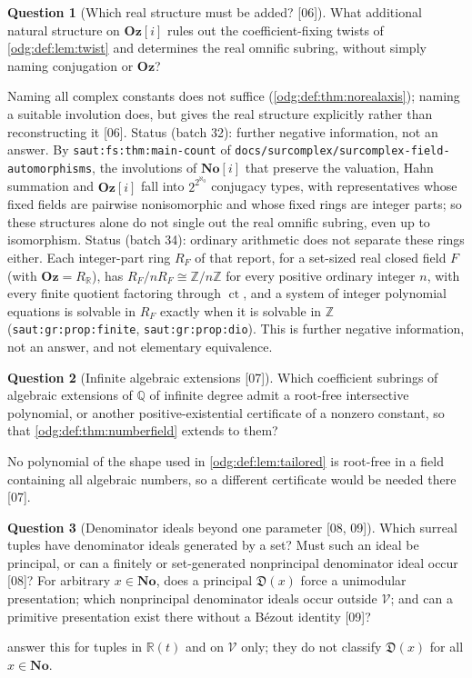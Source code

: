 \documentclass[11pt,oneside]{article}
\numberwithin{equation}{section}
\theoremstyle{definition}
\newtheorem{question}[question]{Question}
\theoremstyle{remark}
\newcommand{\No}{\mathbf{No}}
\newcommand{\Oz}{\mathbf{Oz}}
\newcommand{\Z}{\mathbb Z}
\newcommand{\Q}{\mathbb Q}
\newcommand{\R}{\mathbb R}
\newcommand{\ct}{\operatorname{ct}}
\newcommand{\src}[1]{\textup{\textsf{\small[#1]}}}
\newcommand{\replabel}[1]{\nolinkurl{#1}}
\newcommand{\fn}[1]{\nolinkurl{#1}}
\newcommand{\Og}{\Oz[i]}
\newcommand{\Den}{\mathfrak D}
\newcommand{\Vreg}{\mathcal V}
\begin{document}
\begin{question}[Which real structure must be added? \src{06}]\label{odg:def:q:realform}
What additional natural structure on $\Og$ rules out the coefficient-fixing
twists of \cref{odg:def:lem:twist} and determines the real omnific subring,
without simply naming conjugation or $\Oz$?
\end{question}
Naming all complex constants does not suffice
(\cref{odg:def:thm:norealaxis}); naming a suitable involution does, but
gives the real structure explicitly rather than reconstructing it \src{06}.
Status (batch 32): further negative information, not an answer. By
\replabel{saut:fs:thm:main-count} of
\fn{docs/surcomplex/surcomplex-field-automorphisms}, the involutions of $\No[i]$
that preserve the valuation, Hahn summation and $\Og$ fall into
$2^{2^{\aleph_0}}$ conjugacy types, with representatives whose fixed fields are
pairwise nonisomorphic and whose fixed rings are integer parts; so these
structures alone do not single out the real omnific subring, even up to
isomorphism.
Status (batch 34): ordinary arithmetic does not separate these rings either.
Each integer-part ring $R_F$ of that report, for a set-sized real closed
field $F$ (with $\Oz=R_{\R}$), has $R_F/nR_F\cong\Z/n\Z$ for every positive ordinary
integer $n$, with every finite
quotient factoring through $\ct$, and a system of integer polynomial
equations is solvable in $R_F$ exactly when it is solvable in $\Z$
(\replabel{saut:gr:prop:finite}, \replabel{saut:gr:prop:dio}). This is
further negative information, not an answer, and not elementary equivalence.

\begin{question}[Infinite algebraic extensions \src{07}]\label{odg:def:q:algebraic}
Which coefficient subrings of algebraic extensions of $\Q$ of infinite degree
admit a root-free intersective polynomial, or another positive-existential
certificate of a nonzero constant, so that
\cref{odg:def:thm:numberfield} extends to them?
\end{question}
No polynomial of the shape used in \cref{odg:def:lem:tailored} is root-free in
a field containing all algebraic numbers, so a different certificate would be
needed there \src{07}.

\begin{question}[Denominator ideals beyond one parameter \src{08, 09}]\label{odg:frac:q:ideals}
Which surreal tuples have denominator ideals generated by a set? Must such an
ideal be principal, or can a finitely or set-generated nonprincipal denominator
ideal occur \src{08}? For arbitrary $x\in\No$, does a principal $\Den(x)$ force a
unimodular presentation; which nonprincipal denominator ideals occur outside
$\Vreg$; and can a primitive presentation exist there without a B\'ezout
identity \src{09}?
\end{question}
 answer this for tuples in
$\R(t)$ and on $\Vreg$ only; they do not classify $\Den(x)$ for all $x\in\No$.
\end{document}
